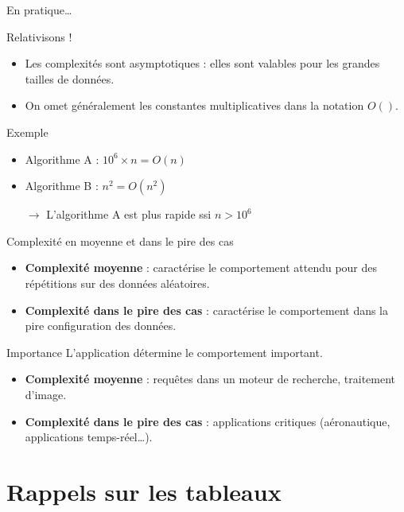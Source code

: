 \begin{frame}{En pratique\dots}
    \begin{block}{Relativisons !}
        \begin{itemize}
        \item Les complexités sont asymptotiques : elles sont valables pour les grandes tailles de données. 
        \item On omet généralement les constantes multiplicatives dans la notation $O()$.
        \end{itemize}
    \end{block}
    \begin{exampleblock}{Exemple}
        \begin{itemize}
            \item Algorithme A : $10^6\times{n} = O(n)$
            \item Algorithme B : $n^2 = O(n^2)$
            \item[$\rightarrow$] L'algorithme A est plus rapide ssi $n>10^6$
        \end{itemize}
    \end{exampleblock}
\end{frame}

\begin{frame}{Complexité en moyenne et dans le pire des cas}
    \begin{itemize}
        \item \textbf{Complexité moyenne} : caractérise le comportement attendu pour des répétitions sur des données aléatoires.
        \item \textbf{Complexité dans le pire des cas} : caractérise le comportement dans la pire configuration des données.
    \end{itemize}

\begin{exampleblock}{Importance}
L'application détermine le comportement important.
\begin{itemize}
\item \textbf{Complexité moyenne} : requêtes dans un moteur de recherche, traitement d'image.
\item \textbf{Complexité dans le pire des cas} : applications critiques (aéronautique, applications temps-réel\dots).
\end{itemize}
\end{exampleblock}

\end{frame}

\section{Rappels sur les tableaux}

